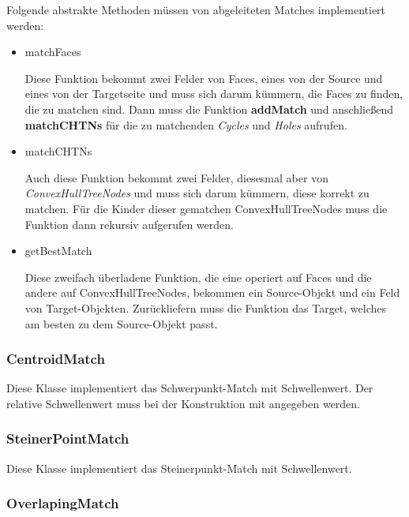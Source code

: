 Folgende abstrakte Methoden müssen von abgeleiteten Matches implementiert werden:

\begin{itemize}

\item matchFaces

Diese Funktion bekommt zwei Felder von Faces, eines von der Source und eines von der Targetseite und muss sich darum kümmern, die Faces zu finden, die zu matchen sind. Dann muss die Funktion \textbf{addMatch} und anschließend \textbf{matchCHTNs} für die zu matchenden \textit{Cycles} und \textit{Holes} aufrufen.

\item matchCHTNs

Auch diese Funktion bekommt zwei Felder, diesesmal aber von \textit{ConvexHullTreeNodes} und muss sich darum kümmern, diese korrekt zu matchen. Für die Kinder dieser gematchen ConvexHullTreeNodes muss die Funktion dann rekursiv aufgerufen werden.

\item getBestMatch

Diese zweifach überladene Funktion, die eine operiert auf Faces und die andere auf ConvexHullTreeNodes, bekommen ein Source-Objekt und ein Feld von Target-Objekten. Zurückliefern muss die Funktion das Target, welches am besten zu dem Source-Objekt passt.

\end{itemize}

\subsubsection{CentroidMatch}

Diese Klasse implementiert das Schwerpunkt-Match mit Schwellenwert. Der relative Schwellenwert muss bei der Konstruktion mit angegeben werden.

\subsubsection{SteinerPointMatch}

Diese Klasse implementiert das Steinerpunkt-Match mit Schwellenwert.

\subsubsection{OverlapingMatch}

